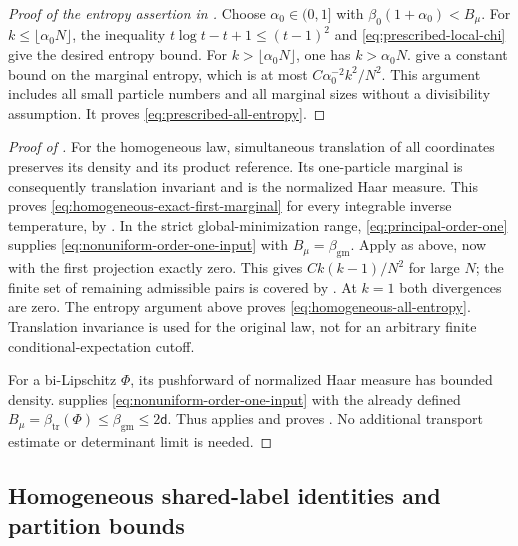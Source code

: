 \documentclass[11pt,reqno]{amsart}
\numberwithin{equation}{section}
\theoremstyle{plain}
\theoremstyle{definition}
\renewcommand{\d}{\mathsf d}
\newcommand{\be}{\beta}
\newcommand{\al}{\alpha}
\newcommand{\gm}{\mathrm{gm}}
\newcommand{\tr}{\mathrm{tr}}
\begin{document}
\begin{proof}[Proof of the entropy assertion in ]
Choose $\al_0\in(0,1]$ with $\be_0(1+\al_0)<B_\mu$. For $k\leq\lfloor\al_0N\rfloor$, the inequality $t\log t-t+1\leq(t-1)^2$ and \eqref{eq:prescribed-local-chi} give the desired entropy bound. For $k>\lfloor\al_0N\rfloor$, one has $k>\al_0N$.  give a constant bound on the marginal entropy, which is at most $C\al_0^{-2}k^2/N^2$. This argument includes all small particle numbers and all marginal sizes without a divisibility assumption. It proves \eqref{eq:prescribed-all-entropy}.
\end{proof}

\begin{proof}[Proof of ]
For the homogeneous law, simultaneous translation of all coordinates preserves its density and its product reference. Its one-particle marginal is consequently translation invariant and is the normalized Haar measure. This proves \eqref{eq:homogeneous-exact-first-marginal} for every integrable inverse temperature, by . In the strict global-minimization range, \eqref{eq:principal-order-one} supplies \eqref{eq:nonuniform-order-one-input} with $B_\mu=\beta_{\gm}$. Apply  as above, now with the first projection exactly zero. This gives $Ck(k-1)/N^2$ for large $N$; the finite set of remaining admissible pairs is covered by . At $k=1$ both divergences are zero. The entropy argument above proves \eqref{eq:homogeneous-all-entropy}. Translation invariance is used for the original law, not for an arbitrary finite conditional-expectation cutoff.

For a bi-Lipschitz $\Phi$, its pushforward of normalized Haar measure has bounded density.  supplies \eqref{eq:nonuniform-order-one-input} with the already defined $B_\mu=\beta_{\tr}(\Phi)\leq\beta_{\gm}\leq2\d$. Thus  applies and proves . No additional transport estimate or determinant limit is needed.
\end{proof}


\subsection{Homogeneous shared-label identities and partition bounds}\label{subsec:replica-identities}
\end{document}

